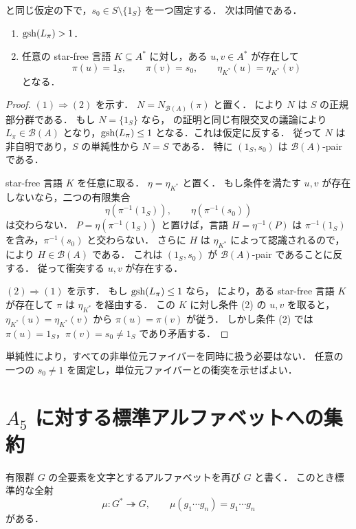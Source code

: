 \begin{corollary}[固定ファイバー衝突条件]\label{cor:fixed-fiber}
 と同じ仮定の下で，$s_0\in S\setminus\{1_S\}$ を一つ固定する．
次は同値である．
\begin{enumerate}
\item $\operatorname{gsh}(L_\pi)>1$．
\item 任意の star-free 言語 $K\subseteq A^*$ に対し，ある $u,v\in A^*$ が存在して
\[
\pi(u)=1_S,
\qquad
\pi(v)=s_0,
\qquad
\eta_{K^*}(u)=\eta_{K^*}(v)
\]
となる．
\end{enumerate}
\end{corollary}

\begin{proof}
$(1)\Rightarrow(2)$ を示す．
$N=N_{\mathcal B(A)}(\pi)$ と置く．
 により $N$ は $S$ の正規部分群である．
もし $N=\{1_S\}$ なら， の証明と同じ有限交叉の議論により $L_\pi\in\mathcal B(A)$ となり，$\operatorname{gsh}(L_\pi)\leq1$ となる．これは仮定に反する．
従って $N$ は非自明であり，$S$ の単純性から $N=S$ である．
特に $(1_S,s_0)$ は $\mathcal B(A)$-pair である．

star-free 言語 $K$ を任意に取る．
$\eta=\eta_{K^*}$ と置く．
もし条件を満たす $u,v$ が存在しないなら，二つの有限集合
\[
\eta(\pi^{-1}(1_S)),
\qquad
\eta(\pi^{-1}(s_0))
\]
は交わらない．
$P=\eta(\pi^{-1}(1_S))$ と置けば，言語 $H=\eta^{-1}(P)$ は $\pi^{-1}(1_S)$ を含み，$\pi^{-1}(s_0)$ と交わらない．
さらに $H$ は $\eta_{K^*}$ によって認識されるので， により $H\in\mathcal B(A)$ である．
これは $(1_S,s_0)$ が $\mathcal B(A)$-pair であることに反する．
従って衝突する $u,v$ が存在する．

$(2)\Rightarrow(1)$ を示す．
もし $\operatorname{gsh}(L_\pi)\leq1$ なら， により，ある star-free 言語 $K$ が存在して $\pi$ は $\eta_{K^*}$ を経由する．
この $K$ に対し条件 (2) の $u,v$ を取ると，$\eta_{K^*}(u)=\eta_{K^*}(v)$ から $\pi(u)=\pi(v)$ が従う．
しかし条件 (2) では $\pi(u)=1_S$，$\pi(v)=s_0\neq1_S$ であり矛盾する．
\end{proof}

単純性により，すべての非単位元ファイバーを同時に扱う必要はない．
任意の一つの $s_0\neq1$ を固定し，単位元ファイバーとの衝突を示せばよい．

\section{$A_5$ に対する標準アルファベットへの集約}

有限群 $G$ の全要素を文字とするアルファベットを再び $G$ と書く．
このとき標準的な全射
\[
\mu:G^*\twoheadrightarrow G,
\qquad
\mu(g_1\cdots g_n)=g_1\cdots g_n
\]
がある．

